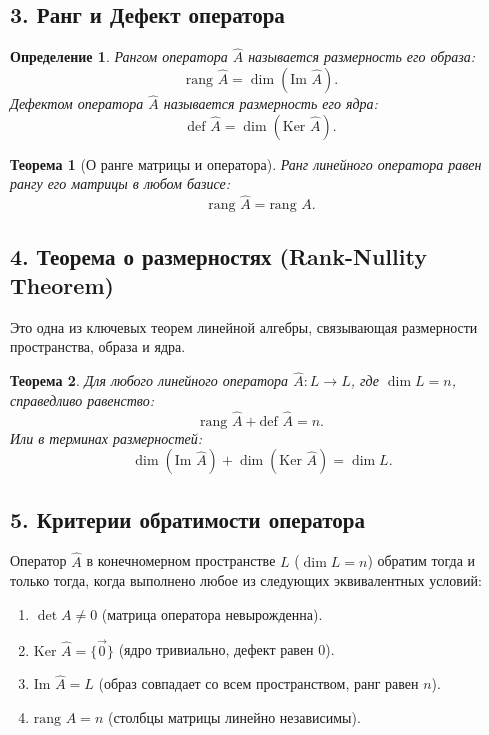 \documentclass[12pt,a4paper]{article}
\theoremstyle{plain}
\newtheorem{definition}{Определение}[section]
\newtheorem{theorem}{Теорема}[section]
\theoremstyle{definition}
\begin{document}
\begin{theorybox}
    \subsection*{3. Ранг и Дефект оператора}
    \begin{definition}
        \textit{Рангом} оператора $\hat{A}$ называется размерность его образа:
        \[
        \text{rang } \hat{A} = \dim(\text{Im } \hat{A}).
        \]
        \textit{Дефектом} оператора $\hat{A}$ называется размерность его ядра:
        \[
        \text{def } \hat{A} = \dim(\text{Ker } \hat{A}).
        \]
    \end{definition}

    \begin{theorem}[О ранге матрицы и оператора]
        Ранг линейного оператора равен рангу его матрицы в любом базисе:
        \[
        \text{rang } \hat{A} = \text{rang } A.
        \]
    \end{theorem}

    \subsection*{4. Теорема о размерностях (Rank-Nullity Theorem)}
    Это одна из ключевых теорем линейной алгебры, связывающая размерности пространства, образа и ядра.

    \begin{theorem}
        Для любого линейного оператора $\hat{A}: L \to L$, где $\dim L = n$, справедливо равенство:
        \[
        \text{rang } \hat{A} + \text{def } \hat{A} = n.
        \]
        Или в терминах размерностей:
        \[
        \dim(\text{Im } \hat{A}) + \dim(\text{Ker } \hat{A}) = \dim L.
        \]
    \end{theorem}

    \subsection*{5. Критерии обратимости оператора}
    Оператор $\hat{A}$ в конечномерном пространстве $L$ ($\dim L = n$) обратим тогда и только тогда, когда выполнено любое из следующих эквивалентных условий:
    \begin{enumerate}
        \item $\det A \neq 0$ (матрица оператора невырожденна).
        \item $\text{Ker } \hat{A} = \{ \vec{0} \}$ (ядро тривиально, дефект равен 0).
        \item $\text{Im } \hat{A} = L$ (образ совпадает со всем пространством, ранг равен $n$).
        \item $\text{rang } A = n$ (столбцы матрицы линейно независимы).
    \end{enumerate}


\end{theorybox}
\end{document}
